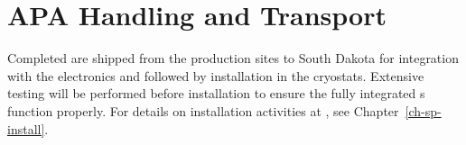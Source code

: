 \section{APA Handling and Transport} %
\label{sec:fdsp-apa-transport}

Completed  are shipped from the  production sites to South Dakota for integration with the   electronics and  followed by installation in the  cryostats.  %
Extensive  testing will be performed before installation to ensure the fully integrated s function properly.  %
For details on installation activities at \surf, see Chapter~\ref{ch-sp-install}. %




